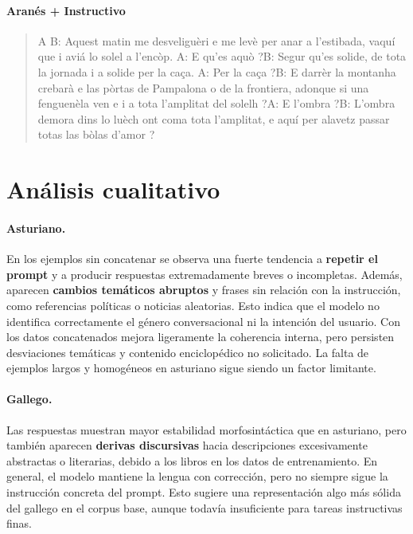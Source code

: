 \paragraph{Aranés + Instructivo}

\begin{quote}
A B: Aquest matin me desveliguèri e me levè per anar a l'estibada, vaquí que i aviá lo solel a l'encòp. A: E qu'es aquò ?B: Segur qu'es solide, de tota la jornada i a solide per la caça. A: Per la caça ?B: E darrèr la montanha crebarà e las pòrtas de Pampalona o de la frontiera, adonque si una fenguenèla ven e i a tota l'amplitat del solelh ?A: E l'ombra ?B: L'ombra demora dins lo luèch ont coma tota l'amplitat, e aquí per alavetz passar totas las bòlas d'amor ?
\end{quote}

\section{Análisis cualitativo}


\paragraph{Asturiano.}
En los ejemplos sin concatenar se observa una fuerte tendencia a \textbf{repetir el prompt} y a producir respuestas extremadamente breves o incompletas. Además, aparecen \textbf{cambios temáticos abruptos} y frases sin relación con la instrucción, como referencias políticas o noticias aleatorias. Esto indica que el modelo no identifica correctamente el género conversacional ni la intención del usuario.  
Con los datos concatenados mejora ligeramente la coherencia interna, pero persisten desviaciones temáticas y contenido enciclopédico no solicitado. La falta de ejemplos largos y homogéneos en asturiano sigue siendo un factor limitante.

\paragraph{Gallego.}
Las respuestas muestran mayor estabilidad morfosintáctica que en asturiano, pero también aparecen \textbf{derivas discursivas} hacia descripciones excesivamente abstractas o literarias, debido a los libros en los datos de entrenamiento. En general, el modelo mantiene la lengua con corrección, pero no siempre sigue la instrucción concreta del prompt. Esto sugiere una representación algo más sólida del gallego en el corpus base, aunque todavía insuficiente para tareas instructivas finas.

